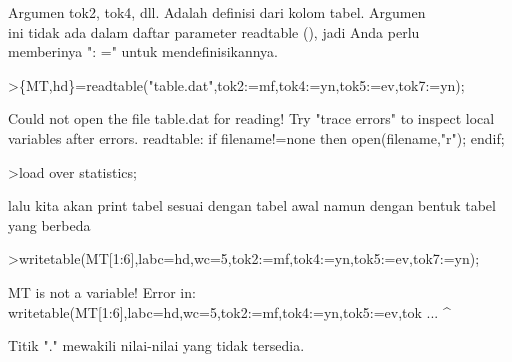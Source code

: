 \documentclass[a4paper,10pt]{article}
\begin{document}
\begin{eulernotebook}
\begin{eulercomment}
\begin{eulercomment}
\begin{eulercomment}
\begin{eulercomment}
\begin{eulercomment}
\begin{eulercomment}
\begin{eulercomment}
\begin{eulercomment}
\begin{eulercomment}
\begin{eulercomment}
\begin{eulercomment}
Argumen tok2, tok4, dll. Adalah definisi dari kolom tabel. Argumen\\
ini tidak ada dalam daftar parameter readtable (), jadi Anda perlu\\
memberinya ": =" untuk mendefinisikannya.
\end{eulercomment}
\begin{eulerprompt}
>\{MT,hd\}=readtable("table.dat",tok2:=mf,tok4:=yn,tok5:=ev,tok7:=yn);
\end{eulerprompt}
\begin{euleroutput}
  Could not open the file
  table.dat
  for reading!
  Try "trace errors" to inspect local variables after errors.
  readtable:
      if filename!=none then open(filename,"r"); endif;
\end{euleroutput}
\begin{eulerprompt}
>load over statistics;
\end{eulerprompt}
\begin{eulercomment}
lalu kita akan print tabel sesuai dengan tabel awal namun dengan
bentuk tabel yang berbeda
\end{eulercomment}
\begin{eulerprompt}
>writetable(MT[1:6],labc=hd,wc=5,tok2:=mf,tok4:=yn,tok5:=ev,tok7:=yn);
\end{eulerprompt}
\begin{euleroutput}
  MT is not a variable!
  Error in:
  writetable(MT[1:6],labc=hd,wc=5,tok2:=mf,tok4:=yn,tok5:=ev,tok ...
                    ^
\end{euleroutput}
\begin{eulercomment}
Titik "." mewakili nilai-nilai yang tidak tersedia.


\end{eulercomment}
\end{eulercomment}
\end{eulercomment}
\end{eulercomment}
\end{eulercomment}
\end{eulercomment}
\end{eulercomment}
\end{eulercomment}
\end{eulercomment}
\end{eulercomment}
\end{eulercomment}
\end{eulernotebook}
\end{document}
